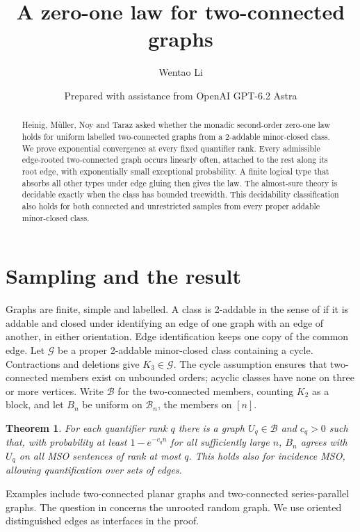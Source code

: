 \documentclass[11pt]{article}
\title{A zero-one law for two-connected graphs}
\author{Wentao Li}
\date{\small Prepared with assistance from OpenAI GPT-6.2 Astra}
\newtheorem{theorem}{Theorem}
\newcommand{\B}{\mathcal B}
\newcommand{\G}{\mathcal G}
\begin{document}
\maketitle
\begin{abstract}
Heinig, M\"uller, Noy and Taraz asked whether the monadic second-order zero-one law holds for uniform labelled two-connected graphs from a 2-addable minor-closed class. We prove exponential convergence at every fixed quantifier rank. Every admissible edge-rooted two-connected graph occurs linearly often, attached to the rest along its root edge, with exponentially small exceptional probability. A finite logical type that absorbs all other types under edge gluing then gives the law. The almost-sure theory is decidable exactly when the class has bounded treewidth. This decidability classification also holds for both connected and unrestricted samples from every proper addable minor-closed class.
\end{abstract}

\section{Sampling and the result}
Graphs are finite, simple and labelled. A class is 2-addable in the sense of \cite[\S6]{hmnt} if it is addable and closed under identifying an edge of one graph with an edge of another, in either orientation. Edge identification keeps one copy of the common edge. Let $\G$ be a proper 2-addable minor-closed class containing a cycle. Contractions and deletions give $K_3\in\G$. The cycle assumption ensures that two-connected members exist on unbounded orders; acyclic classes have none on three or more vertices. Write $\B$ for the two-connected members, counting $K_2$ as a block, and let $B_n$ be uniform on $\B_n$, the members on $[n]$.

\begin{theorem}\label{law}
For each quantifier rank $q$ there is a graph $U_q\in\B$ and $c_q>0$ such that, with probability at least $1-e^{-c_q n}$ for all sufficiently large $n$, $B_n$ agrees with $U_q$ on all MSO sentences of rank at most $q$. This holds also for incidence MSO, allowing quantification over sets of edges.
\end{theorem}
Examples include two-connected planar graphs and two-connected series-parallel graphs. The question in \cite[\S6, extensions to the 2-addable and rooted case]{hmnt} concerns the unrooted random graph. We use oriented distinguished edges as interfaces in the proof.
\end{document}
